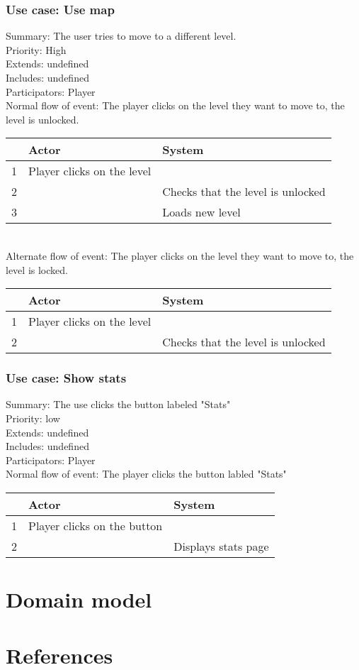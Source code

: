 \documentclass{article}
\begin{document}
\subsubsection{Use case: Use map}
Summary: The user tries to move to a different level.\\
Priority: High\\
Extends: undefined\\
Includes: undefined\\
Participators: Player \\
Normal flow of event: The player clicks on the level they want to move to, the level is unlocked.\\
\begin{tabular}{|c|l|l|} \hline
      & Actor & System \\ \hline
    1 & Player clicks on the level & \\ \hline
    2 & & Checks that the level is unlocked \\ \hline
    3 & & Loads new level \\ \hline
\end{tabular} \\
Alternate flow of event: The player clicks on the level they want to move to, the level is locked.\\
\begin{tabular}{|c|l|l|} \hline
      & Actor & System \\ \hline
    1 & Player clicks on the level & \\ \hline
    2 & & Checks that the level is unlocked \\ \hline
\end{tabular} 

\subsubsection{Use case: Show stats}
Summary: The use clicks the button labeled "Stats"\\
Priority: low\\
Extends: undefined\\
Includes: undefined\\
Participators: Player\\
Normal flow of event: The player clicks the button labled "Stats"\\
\begin{tabular}{|c|l|l|} \hline
      & Actor & System \\ \hline
    1 & Player clicks on the button & \\ \hline
    2 & & Displays stats page \\ \hline
\end{tabular} 



    
\section{Domain model}

\section{References}
\end{document}
